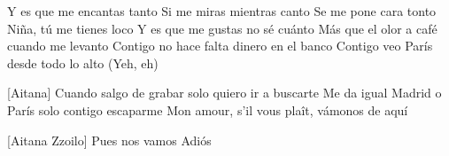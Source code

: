 \begin{guitar}
Y es que me encantas tanto
Si me miras mientras canto
Se me pone cara tonto
Niña, tú me tienes loco
Y es que me gustas no sé cuánto
Más que el olor a café cuando me levanto
Contigo no hace falta dinero en el banco
Contigo veo París desde todo lo alto (Yeh, eh)

[Aitana]
Cuando salgo de grabar solo quiero ir a buscarte
Me da igual Madrid o París solo contigo escaparme
Mon amour, s'il vous plaît, vámonos de aquí

[Aitana Zzoilo]
Pues nos vamos
Adiós
\end{guitar}